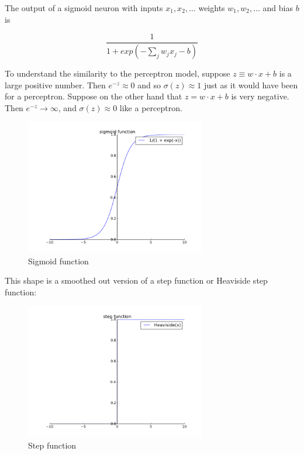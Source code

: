 \documentclass[12 pt]{article}
\begin{document}
The output of a sigmoid neuron with inputs $ x_1, x_2, \ldots{} $
weights $ w_1, w_2, \ldots{} $ and bias $ b $ is

\begin{equation}
    \frac {1}{1 + exp(−\sum_j w_j x_j − b)}
\end{equation}

To understand the similarity to the perceptron model, suppose $ z
\equiv w \cdot x + b $ is a large positive number. Then $ e ^ {−z}
\approx 0 $ and so $ \sigma(z) \approx 1 $ just as it would
have been for a perceptron. Suppose on the other hand that $ z = w
\cdot x + b $ is very negative. Then $ e ^{−z} \to \infty $,
and $ \sigma(z) \approx 0 $ like a perceptron. 

\begin{figure}[htp]
\centering
\includegraphics[width=0.7\textwidth]{./figs/sigmoid_function.png}
\caption{Sigmoid function}
\end{figure}

This shape is a smoothed out version of a step function or Heaviside
step function:

\begin{figure}[htp]
\centering
\includegraphics[width=0.7\textwidth]{./figs/step_function.png}
\caption{Step function}
\end{figure}
\end{document}
